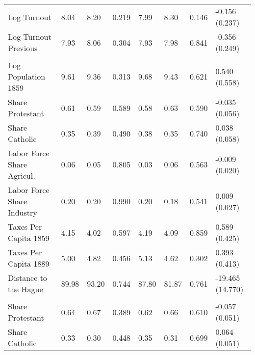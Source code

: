 \begin{table}[!h]
{\begin{threeparttable}
\begin{tabular}[t]{llllllll}
\hspace{1em}Log Turnout & \num{8.04} & \num{8.20} & 0.219 & \num{7.99} & \num{8.30} & 0.146 & -0.156 (0.237)\\
\hspace{1em}Log Turnout Previous & \num{7.93} & \num{8.06} & 0.304 & \num{7.93} & \num{7.98} & 0.841 & -0.356 (0.249)\\
\addlinespace[0.3em]
\multicolumn{8}{l}{\textbf{Panel D: Birthplace Characteristics}}\\
\hspace{1em}Log Population 1859 & \num{9.61} & \num{9.36} & 0.313 & \num{9.68} & \num{9.43} & 0.621 & 0.540 (0.558)\\
\hspace{1em}Share Protestant & \num{0.61} & \num{0.59} & 0.589 & \num{0.58} & \num{0.63} & 0.590 & -0.035 (0.056)\\
\hspace{1em}Share Catholic & \num{0.35} & \num{0.39} & 0.490 & \num{0.38} & \num{0.35} & 0.740 & 0.038 (0.058)\\
\hspace{1em}Labor Force Share Agricul. & \num{0.06} & \num{0.05} & 0.805 & \num{0.03} & \num{0.06} & 0.563 & -0.009 (0.020)\\
\hspace{1em}Labor Force Share Industry & \num{0.20} & \num{0.20} & 0.990 & \num{0.20} & \num{0.18} & 0.541 & 0.009 (0.027)\\
\hspace{1em}Taxes Per Capita 1859 & \num{4.15} & \num{4.02} & 0.597 & \num{4.19} & \num{4.09} & 0.859 & 0.589 (0.425)\\
\hspace{1em}Taxes Per Capita 1889 & \num{5.00} & \num{4.82} & 0.456 & \num{5.13} & \num{4.62} & 0.302 & 0.393 (0.413)\\
\hspace{1em}Distance to the Hague & \num{89.98} & \num{93.20} & 0.744 & \num{87.80} & \num{81.87} & 0.761 & -19.465 (14.770)\\
\addlinespace[0.3em]
\multicolumn{8}{l}{\textbf{Panel E: District Characteristics}}\\
\hspace{1em}Share Protestant & \num{0.64} & \num{0.67} & 0.389 & \num{0.62} & \num{0.66} & 0.610 & -0.057 (0.051)\\
\hspace{1em}Share Catholic & \num{0.33} & \num{0.30} & 0.448 & \num{0.35} & \num{0.31} & 0.699 & 0.064 (0.051)\\

\end{tabular}
\end{threeparttable}}
\end{table}
